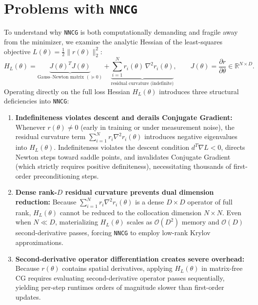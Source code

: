 \documentclass[10pt]{article}
\begin{document}
\section{Problems with \texttt{NNCG}}

To understand why \texttt{NNCG} is both computationally demanding and fragile away from the minimizer, we examine the analytic Hessian of the least-squares objective $L(\theta) = \frac{1}{2}\|r(\theta)\|_2^2$:
\begin{equation}
H_L(\theta) = \underbrace{J(\theta)^T J(\theta)}_{\text{Gauss--Newton matrix } (\succeq 0)} + \underbrace{\sum_{i=1}^N r_i(\theta) \, \nabla^2 r_i(\theta)}_{\text{residual curvature (indefinite)}}, \qquad J(\theta) = \frac{\partial r}{\partial \theta} \in \mathbb{R}^{N \times D}.
\label{eq:hessian_split}
\end{equation}
Operating directly on the full loss Hessian $H_L(\theta)$ introduces three structural deficiencies into \texttt{NNCG}:
\begin{enumerate}[leftmargin=1.4em,itemsep=0.10em,topsep=0.10em]
    \item \textbf{Indefiniteness violates descent and derails Conjugate Gradient:} Whenever $r(\theta) \neq 0$ (early in training or under measurement noise), the residual curvature term $\sum_{i=1}^N r_i \nabla^2 r_i(\theta)$ introduces negative eigenvalues into $H_L(\theta)$. Indefiniteness violates the descent condition $d^T \nabla L < 0$, directs Newton steps toward saddle points, and invalidates Conjugate Gradient (which strictly requires positive definiteness), necessitating thousands of first-order preconditioning steps.
    \item \textbf{Dense rank-$D$ residual curvature prevents dual dimension reduction:} Because $\sum_{i=1}^N r_i \nabla^2 r_i(\theta)$ is a dense $D \times D$ operator of full rank, $H_L(\theta)$ cannot be reduced to the collocation dimension $N \times N$. Even when $N \ll D$, materializing $H_L(\theta)$ scales as $\mathcal{O}(D^2)$ memory and $\mathcal{O}(D)$ second-derivative passes, forcing \texttt{NNCG} to employ low-rank Krylov approximations.
    \item \textbf{Second-derivative operator differentiation creates severe overhead:} Because $r(\theta)$ contains spatial derivatives, applying $H_L(\theta)$ in matrix-free CG requires evaluating second-derivative operator passes sequentially, yielding per-step runtimes orders of magnitude slower than first-order updates.
\end{enumerate}
\end{document}
